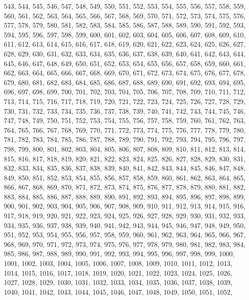 543,
544,
545,
546,
547,
548,
549,
550,
551,
552,
553,
554,
555,
556,
557,
558,
559,
560,
561,
562,
563,
564,
565,
566,
567,
568,
569,
570,
571,
572,
573,
574,
575,
576,
577,
578,
579,
580,
581,
582,
583,
584,
585,
586,
587,
588,
589,
590,
591,
592,
593,
594,
595,
596,
597,
598,
599,
600,
601,
602,
603,
604,
605,
606,
607,
608,
609,
610,
611,
612,
613,
614,
615,
616,
617,
618,
619,
620,
621,
622,
623,
624,
625,
626,
627,
628,
629,
630,
631,
632,
633,
634,
635,
636,
637,
638,
639,
640,
641,
642,
643,
644,
645,
646,
647,
648,
649,
650,
651,
652,
653,
654,
655,
656,
657,
658,
659,
660,
661,
662,
663,
664,
665,
666,
667,
668,
669,
670,
671,
672,
673,
674,
675,
676,
677,
678,
679,
680,
681,
682,
683,
684,
685,
686,
687,
688,
689,
690,
691,
692,
693,
694,
695,
696,
697,
698,
699,
700,
701,
702,
703,
704,
705,
706,
707,
708,
709,
710,
711,
712,
713,
714,
715,
716,
717,
718,
719,
720,
721,
722,
723,
724,
725,
726,
727,
728,
729,
730,
731,
732,
733,
734,
735,
736,
737,
738,
739,
740,
741,
742,
743,
744,
745,
746,
747,
748,
749,
750,
751,
752,
753,
754,
755,
756,
757,
758,
759,
760,
761,
762,
763,
764,
765,
766,
767,
768,
769,
770,
771,
772,
773,
774,
775,
776,
777,
778,
779,
780,
781,
782,
783,
784,
785,
786,
787,
788,
789,
790,
791,
792,
793,
794,
795,
796,
797,
798,
799,
800,
801,
802,
803,
804,
805,
806,
807,
808,
809,
810,
811,
812,
813,
814,
815,
816,
817,
818,
819,
820,
821,
822,
823,
824,
825,
826,
827,
828,
829,
830,
831,
832,
833,
834,
835,
836,
837,
838,
839,
840,
841,
842,
843,
844,
845,
846,
847,
848,
849,
850,
851,
852,
853,
854,
855,
856,
857,
858,
859,
860,
861,
862,
863,
864,
865,
866,
867,
868,
869,
870,
871,
872,
873,
874,
875,
876,
877,
878,
879,
880,
881,
882,
883,
884,
885,
886,
887,
888,
889,
890,
891,
892,
893,
894,
895,
896,
897,
898,
899,
900,
901,
902,
903,
904,
905,
906,
907,
908,
909,
910,
911,
912,
913,
914,
915,
916,
917,
918,
919,
920,
921,
922,
923,
924,
925,
926,
927,
928,
929,
930,
931,
932,
933,
934,
935,
936,
937,
938,
939,
940,
941,
942,
943,
944,
945,
946,
947,
948,
949,
950,
951,
952,
953,
954,
955,
956,
957,
958,
959,
960,
961,
962,
963,
964,
965,
966,
967,
968,
969,
970,
971,
972,
973,
974,
975,
976,
977,
978,
979,
980,
981,
982,
983,
984,
985,
986,
987,
988,
989,
990,
991,
992,
993,
994,
995,
996,
997,
998,
999,
1000,
1001,
1002,
1003,
1004,
1005,
1006,
1007,
1008,
1009,
1010,
1011,
1012,
1013,
1014,
1015,
1016,
1017,
1018,
1019,
1020,
1021,
1022,
1023,
1024,
1025,
1026,
1027,
1028,
1029,
1030,
1031,
1032,
1033,
1034,
1035,
1036,
1037,
1038,
1039,
1040,
1041,
1042,
1043,
1044,
1045,
1046,
1047,
1048,
1049,
1050,
1051,
1052,
